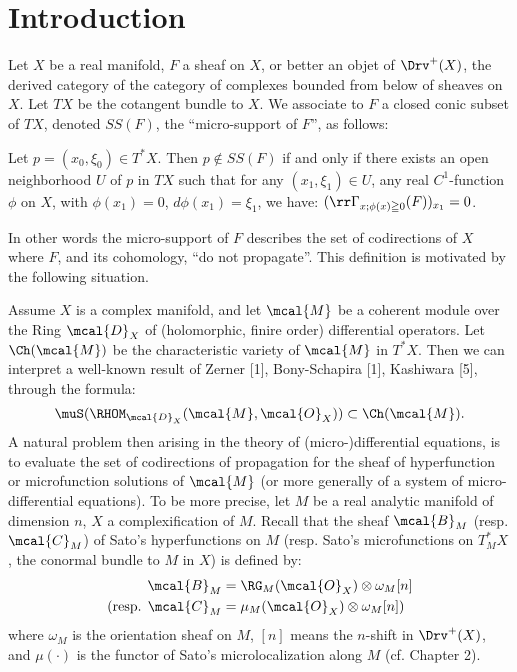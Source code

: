 \chapter*{Introduction}
Let $X$ be a real manifold, 
$F$ a sheaf on $X$, or better an objet of $\Drv^+(X)$, 
the derived category of the category of complexes 
bounded from below of sheaves on $X$. 
Let $TX$ be the cotangent bundle to $X$. 
We associate to $F$ a closed conic subset of $TX$, 
denoted $SS (F)$, the ``micro-support of $F$'', as follows:

\begin{DFN}
    Let $p=(x_0,\xi_0)\in T^\ast X$. 
    Then $p\notin SS(F)$ if and only if 
    there exists an open neighborhood $U$ of $p$ in $TX$ 
    such that for any $(x_1,\xi_1) \in U$, 
    any real $C^1$-function $\phi$ on $X$, 
    with $\phi(x_1)=0$, $d\phi(x_1)=\xi_1$, 
    we have: $(\rr \Gamma_{x;\phi(x)\geqq 0} (F))_{x_1} =0$.
\end{DFN}

In other words 
the micro-support of $F$ describes 
the set of codirections of $X$ where $F$, and its cohomology, 
``do not propagate''. 
This definition is motivated by the following situation. 

Assume $X$ is a complex manifold, 
and let $\mcal{M}$ be a coherent module over 
the Ring $\mcal{D}_X$ of (holomorphic, finire order) 
differential operators. 
Let $\Ch(\mcal{M})$ be the characteristic variety 
of $\mcal{M}$ in $T^\ast X$. 
Then we can interpret a well-known result of Zerner [1], 
Bony-Schapira [1], Kashiwara [5], through the formula:
\begin{equation}
    \muS(\RHOM_{\mcal{D}_X}(\mcal{M},\mcal{O}_X))\subset\Ch(\mcal{M}).
\end{equation}
A natural problem then arising 
in the theory of (micro-)differential equations, 
is to evaluate the set of codirections of propagation for
the sheaf of hyperfunction or microfunction solutions 
of $\mcal{M}$ (or more generally 
of a system of micro-differential equations). 
To be more precise, 
let $M$ be a real analytic manifold of dimension $n$, 
$X$ a complexification of $M$. 
Recall that the sheaf $\mcal{B}_M$ (resp. $\mcal{C}_M$) 
of Sato's hyperfunctions on $M$ (resp. 
Sato's microfunctions on $T^{\ast}_{M}X$, 
the conormal bundle to $M$ in $X$) is defined by:
\begin{align*}
    \mcal{B}_M &= \RG_M(\mcal{O}_X)\otimes\omega_M[n]\\
    (\text{resp. }
    \mcal{C}_M &= \mu_M(\mcal{O}_X)\otimes\omega_M[n])
\end{align*}
where $\omega_M$ is the orientation sheaf on $M$, 
$[n]$ means the $n$-shift in $\Drv^+(X)$, 
and $\mu(\boldsymbol{\cdot})$ is the functor of 
Sato's microlocalization along $M$ (cf. Chapter 2).

